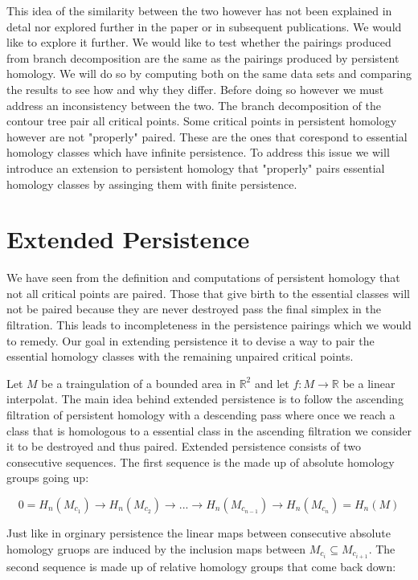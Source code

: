 This idea of the similarity between the two however has not been explained in detal nor explored further in the paper or in subsequent publications. We would like to explore it further. We would like to test whether the pairings produced from branch decomposition are the same as the pairings produced by persistent homology. We will do so by computing both on the same data sets and comparing the results to see how and why they differ. Before doing so however we must address an inconsistency between the two. The branch decomposition of the contour tree pair all critical points. Some critical points in persistent homology however are not "properly" paired. These are the ones that corespond to essential homology classes which have infinite persistence. To address this issue we will introduce an extension to persistent homology that "properly" pairs essential homology classes by assinging them with finite persistence.


\section{Extended Persistence}

We have seen from the definition and computations of persistent homology that not all critical points are paired. Those that give birth to the essential classes will not be paired because they are never destroyed pass the final simplex in the filtration. This leads to incompleteness in the persistence pairings which we would to remedy. Our goal in extending persistence it to devise a way to pair the essential homology classes with the remaining unpaired critical points.


Let $M$ be a traingulation of a bounded area in $\mathbb{R}^2$ and let $f: M \to \mathbb{R}$ be a linear interpolat. The main idea behind extended persistence is to follow the ascending filtration of persistent homology with a descending pass where once we reach a class that is homologous to a essential class in the ascending filtration we consider it to be destroyed and thus paired. Extended persistence consists of two consecutive sequences. The first sequence is the made up of absolute homology groups going up:

$$ 0 = H_n(M_{c_1}) \rightarrow H_n(M_{c_2}) \rightarrow ... \rightarrow H_n(M_{c_{n-1}}) \rightarrow H_n(M_{c_n}) =  H_n(M) $$

Just like in orginary persistence the linear maps between consecutive absolute homology gruops are induced by the inclusion maps between $M_{c_i} \subseteq M_{c_{i+1}}$. The second sequence is made up of relative homology groups that come back down:

